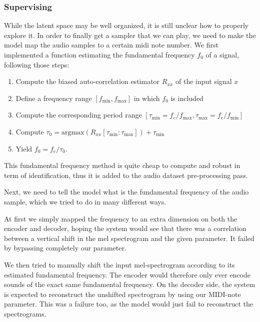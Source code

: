 \documentclass[11pt, english]{article}
\begin{document}
\subsubsection*{Supervising}

While the latent space may be well organized, it is still unclear how to properly explore it. In order to finally get a sampler that we can play, we need to make the model map the audio samples to a certain midi note number. We first implemented a function estimating the fundamental frequency $f_0$ of a signal, following those steps:
\newline
\begin {enumerate}[noitemsep]
    \item Compute the biased auto-correlation estimator $R_{xx}$ of the input signal $x$
    \item Define a frequency range $[f_{\text{min}}, f_{\text{max}}]$ in which $f_0$ is included
    \item Compute the corresponding period range $[\tau_{\text{min}} = f_e / f_{\text{max}}, \tau_{\text{max}} = f_e / f_{\text{min}}]$
    \item Compute $\tau_0 = \text{argmax}(R_{xx}[\tau_{\text{min}}:\tau_{\text{max}}]) + \tau_{\text{min}}$
    \item Yield $f_0 = f_e / \tau_0$.
\end{enumerate}

This fundamental frequency method is quite cheap to compute and robust in term of identification, thus it is added to the audio dataset pre-processing pass.\newline

Next, we need to tell the model what is the fundamental frequency of the audio sample, which we tried to do in many different ways.

At first we simply mapped the frequency to an extra dimension on both the encoder and decoder, hoping the system would see that there was a correlation between a vertical shift in the mel spectrogram and the given parameter. It failed by bypassing completely our parameter.

We then tried to manually shift the input mel-spectrogram according to its estimated fundamental frequency. The encoder would therefore only ever encode sounds of the exact same fundamental frequency. On the decoder side, the system is expected to reconstruct the unshifted spectrogram by using our MIDI-note parameter. This was a failure too, as the model would just fail to reconstruct the spectrograms.\newline
\end{document}

